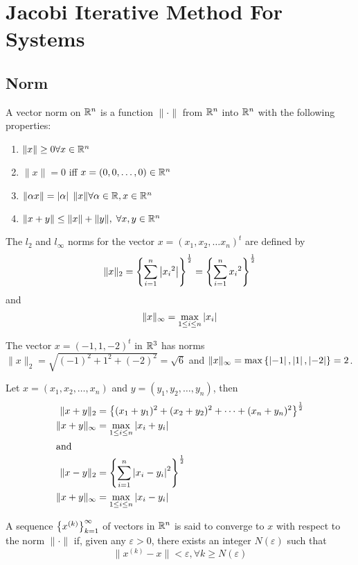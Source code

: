 \documentclass[../main-sheet.tex]{subfiles}
\begin{document}
\chapter{Jacobi Iterative Method For Systems}
\section{Norm}
A vector norm on \(\mathbb{R}^n\) is a function \(\|\cdot \|\) from \(\mathbb{R}^n\) into \(\mathbb{R}^n\) with the following properties:
\begin{enumerate}[label=(\roman*)]
    \item \(\| x\|\geq 0\forall x\in \mathbb{R}^n\)
    \item \(\| x\|= 0\) iff \(x=(0,0,\dots,0)\in \mathbb{R}^n\)
    \item \(\|\alpha x\|=\left\vert\alpha\right\vert \;\|x\|\forall \alpha \in \mathbb{R}, x\in \mathbb{R}^n\)
    \item \(\|x+y\|\leq \|x\|+\|y\|, \;\forall x,y \in \mathbb{R}^n\)
\end{enumerate}
\begin{defn}
    The \(l_2\) and \(l_\infty\) norms for the vector \(x=(x_1,x_2,\dots x_n)^t\) are defined by
    \[
        \|x\|_2=\left\{ \sum_{i=1}^{n}\left\vert{x_i}^2\right\vert \right\}^{\frac{1}{2}}=\left\{ \sum_{i=1}^{n}{x_i}^2 \right\}^{\frac{1}{2}}
    \]
    and 
    \[
        \|x\|_\infty=\max_{1\leq i\leq n}\left\vert x_i\right\vert
    \]
\end{defn}
\begin{ex}
    The vector \(x=(-1,1,-2)^t\) in \(\mathbb{R}^3\) has norms \(\|x\|_2=\sqrt{(-1)^2+1^2+(-2)^2}=\sqrt{6}\) and \(\|x\|_\infty=\max \left\{ \left\vert-1\right\vert,\left\vert1\right\vert,\left\vert-2\right\vert \right\}=2\).
\end{ex}
\begin{note}
    Let \(x=(x_1,x_2,\dots,x_n)\) and \(y=(y_1,y_2,\dots, y_n)\), then 
    \begin{align*}
        \|x+y\|_2&=\left\{(x_1+y_1)^2+(x_2+y_2)^2+\dots+(x_n+y_n)^2\right\}^\frac{1}{2}\\
        \|x+y\|_\infty&=\max_{1\leq i\leq n}\left\vert x_i+y_i\right\vert\\
        \intertext{and}
        \|x-y\|_2&=\left\{\sum_{i=1}^{n}\left\vert x_i-y_i\right\vert^2\right\}^\frac{1}{2}\\
        \|x+y\|_\infty&=\max_{1\leq i\leq n}\left\vert x_i-y_i\right\vert
    \end{align*}
\end{note}
\begin{defn}
    A sequence \(\left\{x^{(k)}\right\}_{k=1}^\infty\) of vectors in \(\mathbb{R}^n\) is said to converge to \(x\) with respect to the norm \(\|\cdot\|\) if, given any \(\varepsilon > 0\), there exists an integer \(N(\varepsilon)\) such that
    \[\|x^{(k)} - x\| < \varepsilon, \forall k \geq N(\varepsilon)\] 
\end{defn}
\end{document}
